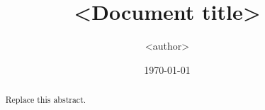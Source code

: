 \documentclass[11pt]{article}
\title{<Document title>\\[0.4em]
\large <one-line subtitle naming the object and the question>}
\author{<author>}
\date{\today}
\begin{document}
\maketitle

\begin{abstract}
  Replace this abstract.
\end{abstract}

\tableofcontents



\begingroup
\sloppy
\printbibliography
\endgroup
\end{document}
